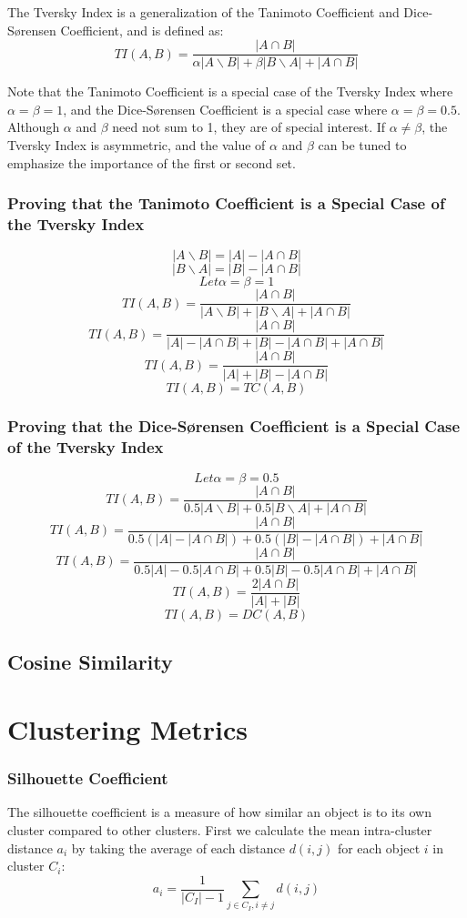 \documentclass[12pt, english, course]{lecture}
\begin{document}
The Tversky Index is a generalization of the Tanimoto Coefficient and Dice-Sørensen Coefficient, and is defined as:
\[TI(A,B) = \frac{|A\cap B|}{\alpha|A \backslash  B| + \beta|B \backslash A| + |A\cap B|}\]

Note that the Tanimoto Coefficient is a special case of the Tversky Index where $\alpha = \beta = 1$, and the Dice-Sørensen Coefficient is a special case where $\alpha = \beta = 0.5$. Although $\alpha$ and $\beta$ need not sum to 1, they are of special interest.
If $\alpha \neq \beta$, the Tversky Index is asymmetric, and the value of $\alpha$ and $\beta$ can be tuned to emphasize the importance of the first or second set.

\subsubsection{Proving that the Tanimoto Coefficient is a Special Case of the Tversky Index}
\[|A \backslash B| = |A| - |A\cap B|\]
\[|B \backslash A| = |B| - |A\cap B|\]
\[Let \alpha = \beta = 1\]
\[TI(A,B) = \frac{|A\cap B|}{|A \backslash  B| + |B \backslash A| + |A\cap B|}\]
\[TI(A,B) = \frac{|A\cap B|}{|A| - |A\cap B| + |B| - |A\cap B| + |A\cap B|}\]
\[TI(A,B) = \frac{|A\cap B|}{|A| + |B| - |A\cap B|}\]
\[TI(A,B) = TC(A,B)\]

\subsubsection{Proving that the Dice-Sørensen Coefficient is a Special Case of the Tversky Index}
\[Let \alpha = \beta = 0.5\]
\[TI(A,B) = \frac{|A\cap B|}{0.5|A \backslash  B| + 0.5|B \backslash A| + |A\cap B|}\]
\[TI(A,B) = \frac{|A\cap B|}{0.5(|A| - |A\cap B|) + 0.5(|B| - |A\cap B|) + |A\cap B|}\]
\[TI(A,B) = \frac{|A\cap B|}{0.5|A| - 0.5|A\cap B| + 0.5|B| - 0.5|A\cap B| + |A\cap B|}\]
\[TI(A,B) = \frac{2|A\cap B|}{|A| + |B|}\]
\[TI(A,B) = DC(A,B)\]

\subsection{Cosine Similarity}


\section{Clustering Metrics}


\subsubsection{Silhouette Coefficient}
The silhouette coefficient is a measure of how similar an object is to its own cluster compared to other clusters.
First we calculate the mean intra-cluster distance $a_i$ by taking the average of each distance $d(i,j)$ for each object $i$ in cluster $C_i$:
\[
    a_i = \frac{1}{|C_I| - 1} \sum_{j \in C_I, i \neq j} d(i, j)
\]
\end{document}
